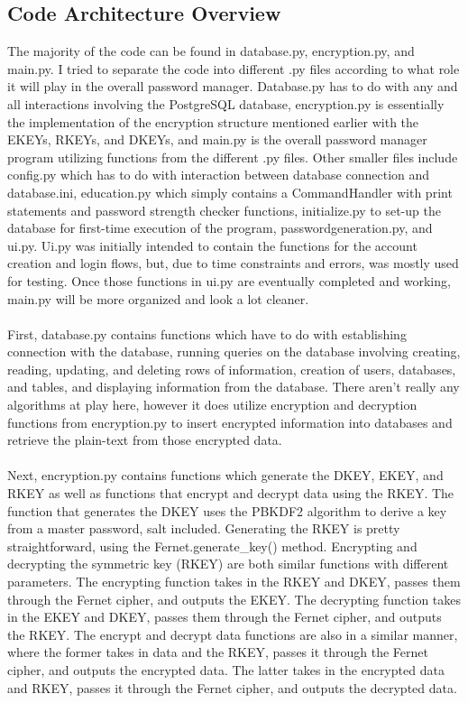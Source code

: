 \documentclass[10pt,twocolumn]{article}
\begin{document}
\subsection{Code Architecture Overview}
The majority of the code can be found in database.py, encryption.py, and main.py. I tried to separate the code into different .py files according to what role it will play in the overall password manager. Database.py has to do with any and all interactions involving the PostgreSQL database, encryption.py is essentially the implementation of the encryption structure mentioned earlier with the EKEYs, RKEYs, and DKEYs, and main.py is the overall password manager program utilizing functions from the different .py files. Other smaller files include config.py which has to do with interaction between database connection and database.ini, education.py which simply contains a CommandHandler with print statements and password strength checker functions, initialize.py to set-up the database for first-time execution of the program, passwordgeneration.py, and ui.py. Ui.py was initially intended to contain the functions for the account creation and login flows, but, due to time constraints and errors, was mostly used for testing. Once those functions in ui.py are eventually completed and working, main.py will be more organized and look a lot cleaner.
\paragraph{}
First, database.py contains functions which have to do with establishing connection with the database, running queries on the database involving creating, reading, updating, and deleting rows of information, creation of users, databases, and tables, and displaying information from the database. There aren't really any algorithms at play here, however it does utilize encryption and decryption functions from encryption.py to insert encrypted information into databases and retrieve the plain-text from those encrypted data.
\paragraph{}
Next, encryption.py contains functions which generate the DKEY, EKEY, and RKEY as well as functions that encrypt and decrypt data using the RKEY. The function that generates the DKEY uses the PBKDF2 algorithm to derive a key from a master password, salt included. Generating the RKEY is pretty straightforward, using the Fernet.generate\_key() method. Encrypting and decrypting the symmetric key (RKEY) are both similar functions with different parameters. The encrypting function takes in the RKEY and DKEY, passes them through the Fernet cipher, and outputs the EKEY. The decrypting function takes in the EKEY and DKEY, passes them through the Fernet cipher, and outputs the RKEY. The encrypt and decrypt data functions are also in a similar manner, where the former takes in data and the RKEY, passes it through the Fernet cipher, and outputs the encrypted data. The latter takes in the encrypted data and RKEY, passes it through the Fernet cipher, and outputs the decrypted data.
\end{document}
